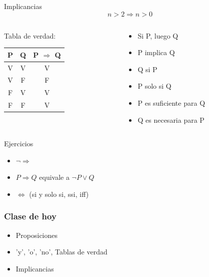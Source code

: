 \documentclass[14pt,aspectratio=169,xcolor=dvipsnames]{beamer}
\begin{document}
\begin{frame}{Implicancias}
    $$ n > 2 \Rightarrow n > 0 $$
    \begin{columns}
        \begin{column}{0.45\textwidth}
            Tabla de verdad:
            \begin{center}
                \begin{tabular}{c c | c}
                    \toprule P & Q & P $\Rightarrow$ Q \\\midrule
                    V & V & V \\
                    V & F & F \\
                    F & V & \alert{V} \\
                    F & F & V  \\ \bottomrule
                \end{tabular}
            \end{center}
        \end{column}
        \begin{column}{0.45\textwidth}
            \begin{itemize}
                \item Si P, luego Q
                \item P implica Q
                \item Q si P
                \item P solo si Q
                \item \alert{P es suficiente para Q}
                \item \alert{Q es necesaria para P}
            \end{itemize}
        \end{column}
    \end{columns}
\end{frame}
\begin{frame}{Ejercicios}
    \begin{itemize}
        \item $\neg \Rightarrow$
        \item $ P\Rightarrow Q$ equivale a $\neg P \vee Q$
        \item $ \Leftrightarrow $  (si y solo si, ssi, iff)
    \end{itemize}
\end{frame}
\begin{frame}\frametitle{Clase de hoy}
    \begin{itemize}
        \item Proposiciones
        \item 'y', 'o', 'no', Tablas de verdad
        \item Implicancias
    \end{itemize}

    \vspace{1cm}
\end{frame}
\begin{frame}
    \maketitle
\end{frame}
\end{document}
